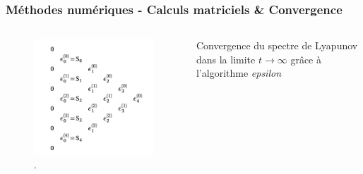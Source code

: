 \begin{frame}
    \frametitle{Méthodes numériques - Calculs matriciels \& Convergence}
    \begin{columns}
        \centering
        \begin{figure}
            \begin{center}
                \includegraphics[scale=0.4]{figures/epsilon_tri_array.png}
            \end{center}
            \caption{\parencite{SENECH}.}
        \end{figure}
        Convergence du spectre de Lyapunov dans la limite $t\to\infty$ grâce à l'algorithme \textit{epsilon}
    \end{columns}
\end{frame}

\begin{frame}
    \begin{center}
    \vspace{0.5cm}
    \end{center}
\end{frame}

